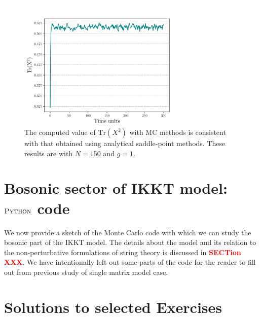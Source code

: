 \documentclass[11pt]{article}
\newcommand{\TODO}[1]{\textcolor{red}{{\bf #1}}}
\begin{document}
\begin{figure}[htbp] 
\centering 
\includegraphics[width=0.75\textwidth]{figs/mm_plot.pdf}
\caption{\label{fig:F_app1}The computed value of $\mbox{Tr}(X^2)$ with MC methods is consistent with that obtained using analytical saddle-point methods. These results are with $N=150$ and $g=1$.}
\end{figure}

\section{Bosonic sector of IKKT model: $\textsc{Python}$ code}

We now provide a sketch of the Monte Carlo code with which we can study the bosonic
part of the IKKT model. The details about the model and its relation to the non-perturbative formulations of string theory is discussed in \TODO{SECTion XXX}. 
We have intentionally left out some parts of the code for the reader to fill out from previous study of single matrix model case.  

\begin{footnotesize} 
	\begin{mdframed}[backgroundcolor=magenta!2] 
			
	\end{mdframed} 
\end{footnotesize}


\section{Solutions to selected Exercises} 
\end{document}
